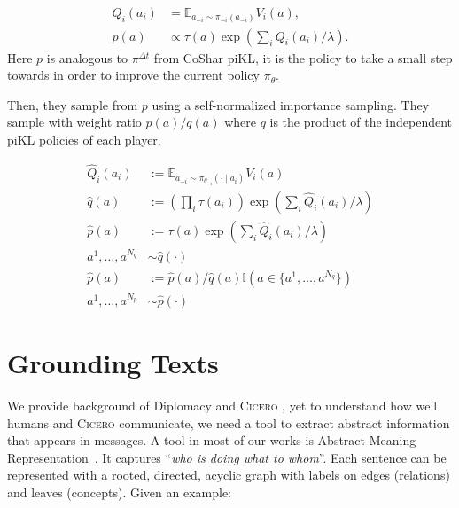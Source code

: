 \documentclass[oneside]{memoir}
\newcommand{\cicero}{\abr{Cicero} }
\newcommand{\abr}[1]{\textsc{#1}}
\begin{document}
\begin{align}
    Q_i(a_i) &= \mathbb{E}_{a_{-i} \sim \pi_{-i}(a_{-i})} V_i(a), \\
    p(a) &\propto \tau(a) \exp\left( \sum_i Q_i(a_i)/\lambda \right). 
\end{align}
Here $p$ is analogous to $\pi^{\Delta t}$ from CoShar piKL, it is the policy to take a small step towards in order to improve the current policy $\pi_{\theta}$.

Then, they sample from $p$ using a self-normalized importance sampling. They sample with weight ratio $p(a)/q(a)$ where $q$ is the product of the independent piKL policies of each player.

\begin{align*}
    \hat{Q}_i(a_i) &:= \mathbb{E}_{a_{-i} \sim \pi_{\theta_{-i}}(\cdot \mid a_i)} V_i(a) \\
    \hat{q}(a) &:= \left( \prod_i \tau(a_i) \right) \exp\left( \sum_i \hat{Q}_i(a_i)/\lambda \right) \\
    \hat{p}(a) &:= \tau(a) \exp\left( \sum_i \hat{Q}_i(a_i)/\lambda \right) \\
    a^1, \ldots, a^{N_q} &\sim \hat{q}(\cdot) \\
    \hat{p}(a) &:= \hat{p}(a)/\hat{q}(a)\mathbb{I}(a \in \{a^1, \ldots, a^{N_q}\}) \\
    a^1, \ldots, a^{N_p} &\sim \hat{p}(\cdot)
\end{align*}

\section{Grounding Texts}
We provide background of Diplomacy and \cicero, yet to understand how well humans and \cicero communicate, we need a tool to extract abstract information that appears in messages. A tool in most of our works is Abstract Meaning Representation~\citep[\abr{amr},][]{banarescu-etal-2013-abstract}. It captures ``\textit{who is doing what to whom}''. Each sentence can be represented with a rooted, directed, acyclic graph with labels on edges (relations) and leaves (concepts). Given an example:
\end{document}
